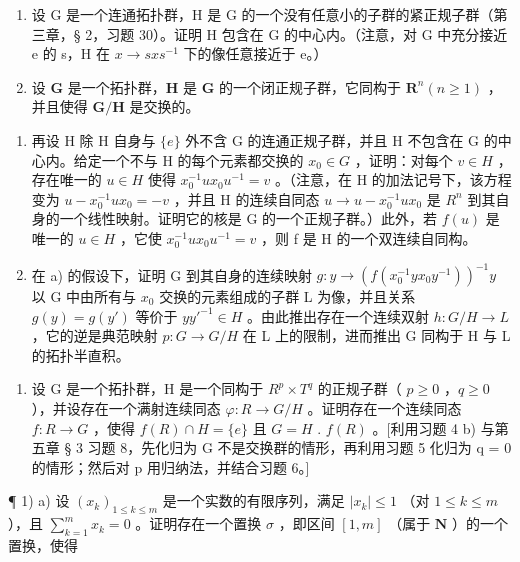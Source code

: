 \begin{enumerate}
\def\labelenumi{\arabic{enumi})}
\setcounter{enumi}{4}
\item
  设 G 是一个连通拓扑群，H 是 G 的一个没有任意小的子群的紧正规子群（第三章，§ 2，习题 30）。证明 H 包含在 G 的中心内。（注意，对 G 中充分接近 e 的 s，H 在 \(x \rightarrow sxs^{-1}\) 下的像任意接近于 e。）
\item
  设 \(\mathbf{G}\) 是一个拓扑群，\(\mathbf{H}\) 是 \(\mathbf{G}\) 的一个闭正规子群，它同构于 \(\mathbf{R}^n (n\geqslant 1)\) ，并且使得 \(\mathbf{G} / \mathbf{H}\) 是交换的。
\end{enumerate}

\begin{enumerate}
\def\labelenumi{\alph{enumi})}
\item
  再设 H 除 H 自身与 \(\{e\}\) 外不含 G 的连通正规子群，并且 H 不包含在 G 的中心内。给定一个不与 H 的每个元素都交换的 \(x_{0} \in G\) ，证明：对每个 \(v \in H\) ，存在唯一的 \(u \in H\) 使得 \(x_{0}^{-1}ux_{0}u^{-1} = v\) 。（注意，在 H 的加法记号下，该方程变为 \(u - x_{0}^{-1}ux_{0} = -v\) ，并且 H 的连续自同态 \(u \to u - x_{0}^{-1}ux_{0}\) 是 \(R^{n}\) 到其自身的一个线性映射。证明它的核是 G 的一个正规子群。）此外，若 \(f(u)\) 是唯一的 \(u \in H\) ，它使 \(x_{0}^{-1}ux_{0}u^{-1} = v\) ，则 f 是 H 的一个双连续自同构。
\item
  在 a) 的假设下，证明 G 到其自身的连续映射 \(g: y \to (f(x_{0}^{-1}yx_{0}y^{-1}))^{-1}y\) 以 G 中由所有与 \(x_{0}\) 交换的元素组成的子群 L 为像，并且关系 \(g(y) = g(y')\) 等价于 \(yy'^{-1} \in H\) 。由此推出存在一个连续双射 \(h: G/H \to L\) ，它的逆是典范映射 \(p: G \to G/H\) 在 L 上的限制，进而推出 G 同构于 H 与 L 的拓扑半直积。
\end{enumerate}

\begin{enumerate}
\def\labelenumi{\arabic{enumi})}
\setcounter{enumi}{6}
\tightlist
\item
  设 G 是一个拓扑群，H 是一个同构于 \(R^{p} \times T^{q}\) 的正规子群（ \(p \geqslant 0\) ，\(q \geqslant 0\) ），并设存在一个满射连续同态 \(\varphi: R \to G/H\) 。证明存在一个连续同态 \(f: R \to G\) ，使得 \(f(R) \cap H = \{e\}\) 且 \(G = H\) . \(f(R)\) 。{[}利用习题 4 b) 与第五章 § 3 习题 8，先化归为 G 不是交换群的情形，再利用习题 5 化归为 q = 0 的情形；然后对 p 用归纳法，并结合习题 6。{]}
\end{enumerate}

\ExerciseSection

¶ 1) a) 设 \((x_{k})_{1\leqslant k\leqslant m}\) 是一个实数的有限序列，满足 \(|x_k|\leqslant 1\) （对 \(1\leqslant k\leqslant m\) ），且 \(\sum_{k = 1}^{m}x_{k} = 0\) 。证明存在一个置换 \(\sigma\) ，即区间 \([1,m]\) （属于 \(\mathbf{N}\) ）的一个置换，使得

